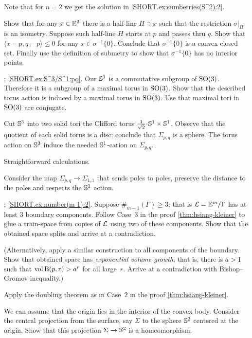 Note that for $n=2$ we get the solution in \ref{SHORT.ex:sumbetries(S^2):2}.

Show that for any $x\in\mathbb{E}^2$ there is a half-line $H\ni x$ such that 
the restriction $\sigma|_H$ is an isometry.
Suppose such half-line $H$ starts at $p$ and passes thru $q$.
Show that $\langle x-p,q-p \rangle\le 0$ for any $x\in \sigma^{-1}\{0\}$.
Conclude that $\sigma^{-1}\{0\}$ is a convex closed set.
Finally use the definition of submetry to show that  $\sigma^{-1}\{0\}$ has no interior points. 

\parbf{\ref{ex:S^3/S^1}};
\ref{SHORT.ex:S^3/S^1:pq}.
Our $\mathbb{S}^1$ is a commutative subgroup of $\mathrm{SO}(3)$.
Therefore it is a subgroup of a maximal torus in $\mathrm{SO}(3)$.
Show that the described torus action is induced by a maximal torus in $\mathrm{SO}(3)$.
Use that maximal tori in $\mathrm{SO}(3)$ are conjugate.

Cut $\mathbb{S}^3$ into two solid tori the Clifford torus $\tfrac1{\sqrt2}\cdot \SSS^1\times \SSS^1$.
Observe that the quotient of each solid torus is a disc;
conclude that $\Sigma_{p,q}$ is a sphere.
The torus action on $\mathbb{S}^3$ induce the needed $\mathbb{S}^1$-cation on $\Sigma_{p,q}$.

 Straightforward calculations.

Consider the map $\Sigma_{p,q}\to\Sigma_{1,1}$ that sends poles to poles,
preserve the distance to the poles and respects the $\mathbb{S}^1$ action.

\parbf{\ref{ex:number(m-1)}};
\ref{SHORT.ex:number(m-1):2}.
Suppose $\#_{m-1}(\Gamma)\ge 3$;
that is $\mathcal{L}=\mathbb{E}^m/\Gamma$ has at least 3 boundary components.
Follow Case~3 in the proof \ref{thm:hsiang-kleiner} to glue a train-space from copies of $\mathcal{L}$ using two of these components.
Show that the obtained space splits and arrive at a contradiction.

(Alternatively, apply a similar construction to all components of the boundary.
Show that obtained space has {}\emph{exponential volume growth};
that is, there is $a>1$ such that $\operatorname{\rm vol}\nolimits \mathrm{B}{}(p,r)>a^r$ for all large~$r$.
Arrive at a contradiction with Bishop--Gromov inequality.)

Apply the doubling theorem as in Case~2 in the proof \ref{thm:hsiang-kleiner}.

We can assume that the origin lies in the interior of the convex body.
Consider the central projection from the surface, say $\Sigma$ to the sphere $\mathbb{S}^2$ centered at the origin.
Show that this projection $\Sigma\to \mathbb{S}^2$ is a homeomorphism.

